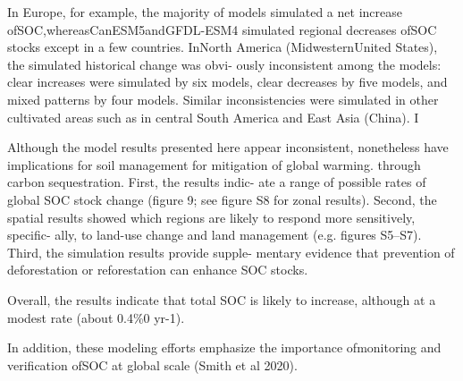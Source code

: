 \documentclass{article}
\begin{document}
In Europe, for example, the majority of models simulated a net increase ofSOC,whereasCanESM5andGFDL-ESM4 simulated regional decreases ofSOC stocks except in a few countries. InNorth America (MidwesternUnited States), the simulated historical change was obvi- ously inconsistent among the models: clear increases were simulated by six models, clear decreases by five models, and mixed patterns by four models. Similar inconsistencies were simulated in other cultivated areas such as in central South America and East Asia (China). I

Although the model results presented here appear inconsistent, nonetheless have implications for soil management for mitigation of global warming. through carbon sequestration. First, the results indic- ate a range of possible rates of global SOC stock change (figure 9; see figure S8 for zonal results). Second, the spatial results showed which regions
are likely to respond more sensitively, specific- ally, to land-use change and land management (e.g. figures S5–S7). Third, the simulation results provide supple-
mentary evidence that prevention of deforestation or reforestation can enhance SOC stocks.

Overall, the results indicate that total SOC is likely to increase, although at a modest rate (about 0.4\%0 yr-1). 

In addition, these modeling efforts emphasize the importance ofmonitoring and verification ofSOC at global scale (Smith et al 2020).
\end{document}
